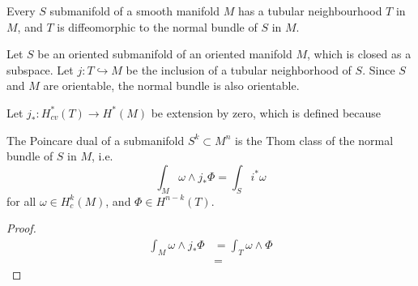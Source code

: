 \begin{thm} 
	Every $S$ submanifold of a smooth manifold $M$ has a 
	tubular neighbourhood  $T$ in $M$, and  
	$T$ is diffeomorphic to the normal bundle of $S$ in $M$.
\end{thm}

Let $S$ be an oriented submanifold of an oriented manifold $M$, which is closed
as a subspace. Let $j:T \hookrightarrow M$ be the inclusion
of a tubular neighborhood of  $S$. Since $S$ and  $M$ are orientable, the normal
bundle is also orientable. %

Let $j_*: H_{cv}^{*}(T) \to H^*(M)$ be extension by zero, which is defined 
because %

\begin{thm} %
	The Poincare dual of a submanifold $S^k \subset M^n$ is the Thom class of the
	normal bundle of $S$ in  $M$, i.e. 
	\[
		\int_M \omega\wedge j_*\Phi = \int_S i^*\omega 
	\] 
	for all $\omega\in H^k_c(M)$, and $\Phi\in H^{n-k}(T)$.
\end{thm}
\begin{proof}
	\begin{align*}
		\int_M \omega\wedge j_*\Phi 
		&= \int_T \omega \wedge \Phi \\
		&=  
	\end{align*}
\end{proof}

